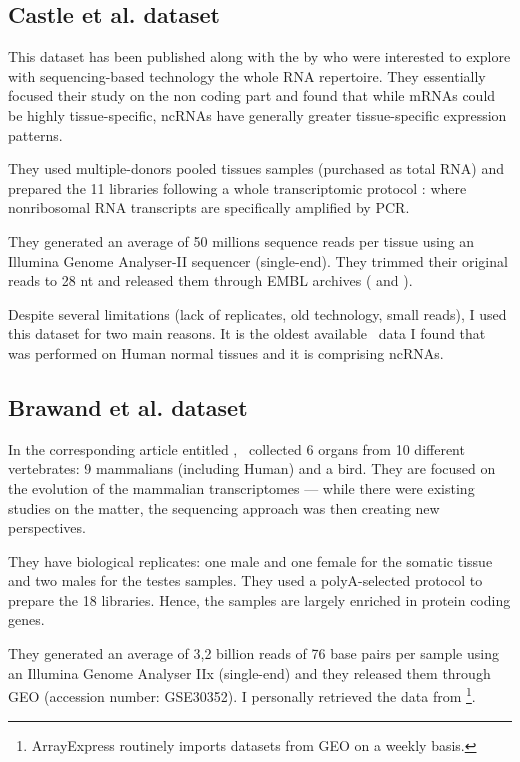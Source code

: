 \subsection{Castle et al. dataset}

This dataset has been published along with the 
by \citet{castleData} who were interested to explore
with sequencing-based technology the whole RNA repertoire. They essentially
focused their study on the non coding part and found that
while \glspl{mRNA} could be highly tissue-specific, \glspl{ncRNA} have generally
greater tissue-specific expression patterns.

They used multiple-donors pooled tissues samples (purchased as total \gls{RNA})
and prepared the 11 libraries following a whole transcriptomic protocol
\citep{Armour:2009}: where nonribosomal \gls{RNA} transcripts are
specifically amplified by \gls{PCR}.

They generated an average of 50 millions sequence reads per tissue
using an Illumina Genome Analyser-II sequencer (single-end).
They trimmed their original reads to 28 \gls{nt}
and released them through EMBL archives (
and ).

Despite several limitations (lack of replicates, old technology, small reads),
I used this dataset for two main reasons. It is the oldest available \Rnaseq\
data I found that was performed on Human normal tissues and it is comprising
\glspl{ncRNA}.

\subsection{Brawand et al. dataset}

In the corresponding article entitled ,
\citet{VTpaper}~collected 6 organs from 10 different vertebrates:
9 mammalians (including Human) and a bird. They are focused on the
evolution of the mammalian transcriptomes --- while there were existing studies
on the matter, the sequencing approach was then creating new perspectives.

They have biological replicates: one male
and one female for the somatic tissue and two males for the testes samples.
They used a polyA-selected protocol to prepare the 18 libraries.
Hence, the samples are largely enriched in protein coding genes.

They generated an average of 3,2 billion reads of 76 base pairs per sample
using an Illumina Genome Analyser IIx (single-end) and they released them
through \gls{GEO} (accession number: GSE30352).
I personally retrieved the data from
\footnote{ArrayExpress routinely imports
datasets from \gls{GEO} on a weekly basis.}.

